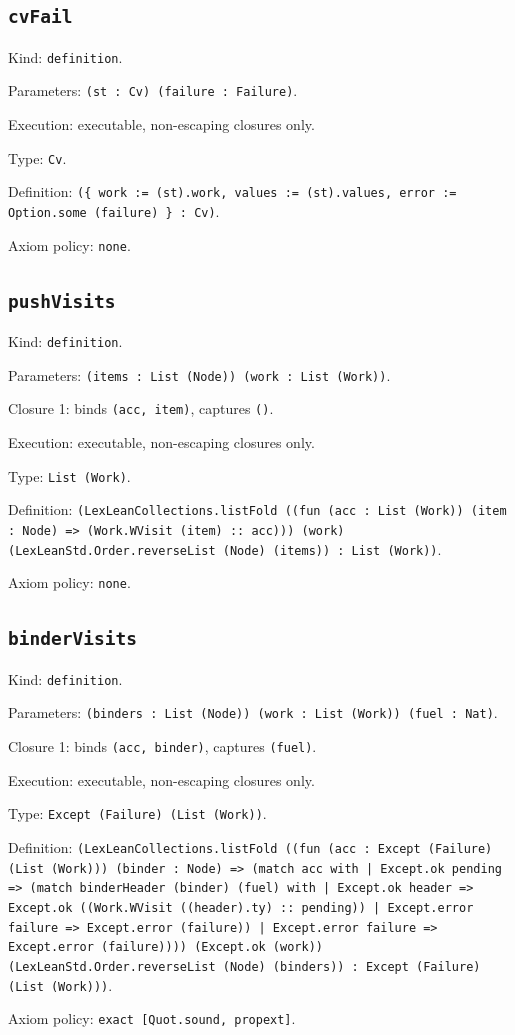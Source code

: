 \documentclass[11pt]{article}
\begin{document}
\subsection*{\texttt{cvFail}}
\noindent Kind: \texttt{definition}.\par
\noindent Parameters: \texttt{(st : Cv) (failure : Failure)}.\par
\noindent Execution: executable, non-escaping closures only.\par
\noindent Type: \texttt{Cv}.\par
\noindent Definition: \texttt{(\{ work := (st).work, values := (st).values, error := Option.some (failure) \} : Cv)}.\par
\noindent Axiom policy: \texttt{none}.\par
\subsection*{\texttt{pushVisits}}
\noindent Kind: \texttt{definition}.\par
\noindent Parameters: \texttt{(items : List (Node)) (work : List (Work))}.\par
\noindent Closure 1: binds \texttt{(acc, item)}, captures \texttt{()}.\par
\noindent Execution: executable, non-escaping closures only.\par
\noindent Type: \texttt{List (Work)}.\par
\noindent Definition: \texttt{(LexLeanCollections.listFold ((fun (acc : List (Work)) (item : Node) => (Work.WVisit (item) :: acc))) (work) (LexLeanStd.Order.reverseList (Node) (items)) : List (Work))}.\par
\noindent Axiom policy: \texttt{none}.\par
\subsection*{\texttt{binderVisits}}
\noindent Kind: \texttt{definition}.\par
\noindent Parameters: \texttt{(binders : List (Node)) (work : List (Work)) (fuel : Nat)}.\par
\noindent Closure 1: binds \texttt{(acc, binder)}, captures \texttt{(fuel)}.\par
\noindent Execution: executable, non-escaping closures only.\par
\noindent Type: \texttt{Except (Failure) (List (Work))}.\par
\noindent Definition: \texttt{(LexLeanCollections.listFold ((fun (acc : Except (Failure) (List (Work))) (binder : Node) => (match acc with | Except.ok pending => (match binderHeader (binder) (fuel) with | Except.ok header => Except.ok ((Work.WVisit ((header).ty) :: pending)) | Except.error failure => Except.error (failure)) | Except.error failure => Except.error (failure)))) (Except.ok (work)) (LexLeanStd.Order.reverseList (Node) (binders)) : Except (Failure) (List (Work)))}.\par
\noindent Axiom policy: \texttt{exact [Quot.sound, propext]}.\par
\end{document}
